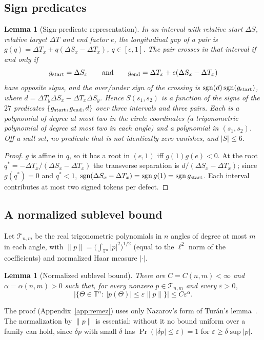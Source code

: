\documentclass[11pt]{article}
\newtheorem{lemma}[theorem]{Lemma}
\theoremstyle{remark}\newtheorem{remark}[theorem]{Remark}
\begin{document}
\subsection{Sign predicates}
\begin{lemma}[Sign-predicate representation]\label{lem:pred}
In an interval with relative start $\Delta S$, relative target $\Delta T$ and end factor $e$, the longitudinal gap of a pair is $g(q)=\Delta T_x+q(\Delta S_x-\Delta T_x)$, $q\in[e,1]$. The pair crosses in that interval if and only if
\[
g_{\rm start}=\Delta S_x\qquad\text{and}\qquad g_{\rm end}=\Delta T_x+e(\Delta S_x-\Delta T_x)
\]
have opposite signs, and the over/under sign of the crossing is $\operatorname{sgn}(d)\operatorname{sgn}(g_{\rm start})$, where $d=\Delta T_y\Delta S_x-\Delta T_x\Delta S_y$. Hence $S(s_1,s_2)$ is a function of the signs of the $27$ predicates $\{g_{\rm start},g_{\rm end},d\}$ over three intervals and three pairs. Each is a polynomial of degree at most two in the circle coordinates (a trigonometric polynomial of degree at most two in each angle) and a polynomial in $(s_1,s_2)$. Off a null set, no predicate that is not identically zero vanishes, and $|S|\le6$.
\end{lemma}
\begin{proof}
$g$ is affine in $q$, so it has a root in $(e,1)$ iff $g(1)g(e)<0$. At the root $q^*=-\Delta T_x/(\Delta S_x-\Delta T_x)$ the transverse separation is $d/(\Delta S_x-\Delta T_x)$; since $g(q^*)=0$ and $q^*<1$, $\operatorname{sgn}(\Delta S_x-\Delta T_x)=\operatorname{sgn}g(1)=\operatorname{sgn}g_{\rm start}$. Each interval contributes at most two signed tokens per defect.
\end{proof}

\subsection{A normalized sublevel bound}
Let $\mathcal T_{n,m}$ be the real trigonometric polynomials in $n$ angles of degree at most $m$ in each angle, with $\|p\|=\bigl(\int_{\mathbb T^n}|p|^2\bigr)^{1/2}$ (equal to the $\ell^2$ norm of the coefficients) and normalized Haar measure $|\cdot|$.
\begin{lemma}[Normalized sublevel bound]\label{lem:remez}
There are $C=C(n,m)<\infty$ and $\alpha=\alpha(n,m)>0$ such that, for every nonzero $p\in\mathcal T_{n,m}$ and every $\varepsilon>0$,
\[
\bigl|\{\Theta\in\mathbb T^n:\ |p(\Theta)|\le\varepsilon\|p\|\}\bigr|\le C\varepsilon^{\alpha}.
\]
\end{lemma}
The proof (Appendix~\ref{app:remez}) uses only Nazarov's form of Turán's lemma~\cite{nazarov}. The normalization by $\|p\|$ is essential: without it no bound uniform over a family can hold, since $\delta p$ with small $\delta$ has $\Pr(|\delta p|\le\varepsilon)=1$ for $\varepsilon\ge\delta\sup|p|$.
\end{document}
